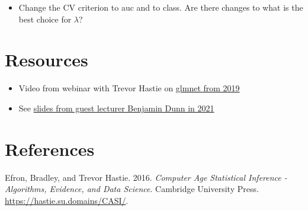 \documentclass[
  letterpaper,
  DIV=11,
  numbers=noendperiod]{scrartcl}
\providecommand{\tightlist}{%
  \setlength{\itemsep}{0pt}\setlength{\parskip}{0pt}}\usepackage{longtable,booktabs,array}
\newlength{\cslhangindent}
\newlength{\cslentryspacingunit} %
\newenvironment{CSLReferences}[2] %
 {%
  \setlength{\parindent}{0pt}
  \ifodd #1
  \let\oldpar\par
  \def\par{\hangindent=\cslhangindent\oldpar}
  \fi
  \setlength{\parskip}{#2\cslentryspacingunit}
 }%
 {}
\begin{document}
\begin{itemize}
\tightlist
\item
  Change the CV criterion to auc and to class. Are there changes to what
  is the best choice for \(\lambda\)?
\end{itemize}

\hypertarget{resources}{%
\section{Resources}\label{resources}}

\begin{itemize}
\tightlist
\item
  Video from webinar with Trevor Hastie on
  \href{http://youtu.be/BU2gjoLPfDc}{glmnet from 2019}
\item
  See
  \href{https://github.com/mettelang/MA8701V2021/blob/main/Part1/LassoandfriendsBenDunn.pdf}{slides
  from guest lecturer Benjamin Dunn in 2021}
\end{itemize}

\hypertarget{references}{%
\section{References}\label{references}}

\hypertarget{refs}{}
\begin{CSLReferences}{1}{0}
\leavevmode{}%
Efron, Bradley, and Trevor Hastie. 2016. \emph{Computer Age Statistical
Inference - Algorithms, Evidence, and Data Science}. Cambridge
University Press. \url{https://hastie.su.domains/CASI/}.

\end{CSLReferences}
\end{document}
